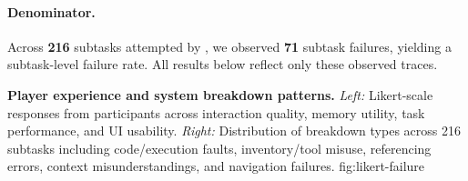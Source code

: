 \paragraph{Denominator.}
Across \textbf{216} subtasks attempted by \textbf{\NumParticipants{}}, we observed \textbf{71} subtask failures, yielding a \textbf{\SubtaskFailureRate{}} subtask-level failure rate. All results below reflect only these observed traces.

  


{\textbf{Player experience and system breakdown patterns.}
  \emph{Left:} Likert-scale responses from participants across interaction quality, 
  memory utility, task performance, and UI usability.
  \emph{Right:} Distribution of breakdown types across 216 subtasks including 
  code/execution faults, inventory/tool misuse, referencing errors, context misunderstandings, 
  and navigation failures.
}
{fig:likert-failure}

